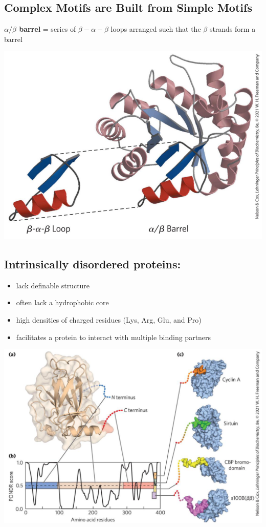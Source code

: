 \documentclass[10pt]{article}
\begin{document}
\subsection*{Complex Motifs are Built from Simple Motifs}
\textbf{$\alpha / \beta$ barrel} = series of $\beta-\alpha-\beta$ loops arranged such that the $\beta$ strands form a barrel
\begin{center}
    \includegraphics*[scale=0.5]{L1_15.png}
\end{center}

\subsection*{Intrinsically disordered proteins:}
\begin{itemize}
    \item lack definable structure
    \item often lack a hydrophobic core
    \item high densities of charged residues (Lys, Arg, Glu, and Pro)
    \item facilitates a protein to interact with multiple binding partners
\end{itemize}

\begin{center}
    \includegraphics*[scale=0.5]{L1_16.png}
\end{center}
\end{document}
